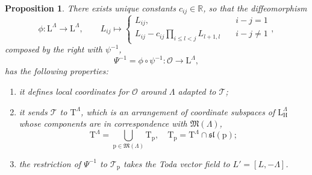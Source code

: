 \documentclass[reqno]{amsart}
\newcommand{\p}{\mathrm{p}}
\renewcommand{\sl}{\mathfrak{sl}}
\newcommand{\cO}{\mathcal{O}}
\newcommand{\cT}{\mathcal{T}}
\newcommand{\cU}{\mathcal{U}}
\newcommand{\R}{\mathbb{R}}
\newcommand{\T}{\mathbb{T}}
\newcommand{\pr}{\mathrm{pr}}
\renewcommand{\L}{\mathrm{L}}
\renewcommand{\T}{\mathrm{T}}
\renewcommand{\H}{\mathrm{H}}
\newtheorem{proposition}[theorem]{Proposition}
\begin{document}
\begin{proposition}\label{pro:adapted-coordinates}
There exists unique constants $c_{ij}\in \R$, so that the diffeomorphism
\[\phi:\L^\Lambda\to \L^\Lambda,\qquad L_{ij}\mapsto \begin{cases}L_{ij},&\quad {i-j}=1\\
                L_{ij}-c_{ij}\prod_{i\leq l< j}L_{l+1,l}&\quad i-j\neq 1\end{cases},\]
 composed by the right with $\psi^{-1}$,
\[\Psi^{-1}=\phi\circ \psi^{-1}:\cO\to \L^\Lambda,\] has the following properties:
\begin{enumerate}
 \item it defines local coordinates for $\cO$ around $\Lambda$ adapted to $\cT$;
 \item it sends $\cT$ to $\T^\Lambda$, which is an arrangement of coordinate subspaces of $\L^\Lambda_\H$ whose components are in correspondence with $\mathfrak{M}(\Lambda)$,
\[\T^\Lambda=\bigcup_{\p\in \mathfrak{M}(\Lambda)}\T_{\p},\quad \T_\p=\T^\Lambda\cap \sl(\p);\]
 \item the restriction of $\Psi^{-1}$ to $\cT_\p$ takes the Toda vector field to  $L'=[L,-\Lambda]$.
\end{enumerate}
%
\end{proposition}
\end{document}
